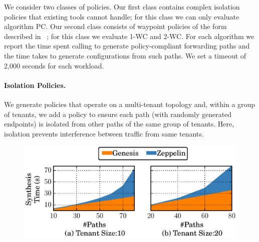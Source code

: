 We consider two classes of policies.
Our first class contains complex isolation policies that 
existing tools cannot handle; 
for this class we can only 
evaluate algorithm PC.
Our second class consists of
 waypoint policies of the form described in ~;
for this class we evaluate 1-WC and 2-WC.
For each algorithm we report the time spent 
calling \genesis to generate policy-compliant forwarding paths
and the time \name takes to generate configurations 
from such paths. 
We set a timeout of 2,000 seconds for each workload.



\paragraph{Isolation Policies.}
We generate policies that operate 
on a multi-tenant topology and,
within a  group of tenants, we add a policy to ensure
each path  (with randomly generated endpoints)
is isolated from other paths of the same group of tenants.
Here, isolation  prevents interference between traffic from
same tenants.  
 
 \begin{figure}
 	\includegraphics[width=\linewidth]{figures/ospfisolation.eps}
 	\vspace{-8pt}
 \end{figure}
 
